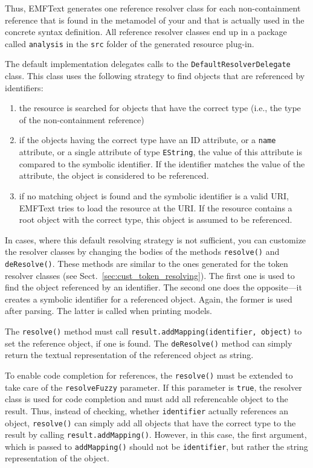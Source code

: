 Thus, EMFText generates one reference resolver class for each non-containment
reference that is found in the metamodel of your \DSL and that is actually used
in the concrete syntax definition. All reference resolver classes end up in a
package called \texttt{analysis} in the \texttt{src} folder of the generated 
resource plug-in.

The default implementation delegates calls to the
\texttt{DefaultResolverDelegate} class. This class uses the following strategy
to find objects that are referenced by identifiers:

\begin{enumerate}
  \item the resource is searched for objects that have the correct type (i.e.,
  the type of the non-containment reference)
  \item if the objects having the correct type have an ID attribute, or a
  \texttt{name} attribute, or a single attribute of type \texttt{EString}, the
  value of this attribute is compared to the symbolic identifier. If the
  identifier matches the value of the attribute, the object is considered to be
  referenced.
  \item if no matching object is found and the symbolic identifier is a valid
  URI, EMFText tries to load the resource at the URI. If the resource
  contains a root object with the correct type, this object is assumed to be
  referenced.
\end{enumerate}

In cases, where this default resolving strategy is not sufficient, you can
customize the resolver classes by changing the bodies of the methods
\texttt{resolve()} and \texttt{deResolve()}. These methods are similar to the
ones generated for the token resolver classes (see
Sect.~\ref{sec:cust_token_resolving}). The first one is used to find the object
referenced by an identifier. The second one does the opposite---it creates a
symbolic identifier for a referenced object. Again, the former is used after
parsing. The latter is called when printing models.

The \texttt{resolve()} method must call \texttt{result.addMapping(identifier,
object)} to set the reference object, if one is found. The
\texttt{deResolve()} method can simply return the textual representation of the
referenced object as string.

To enable code completion for references, the \texttt{resolve()} must be
extended to take care of the \texttt{resolveFuzzy} parameter. If this parameter is
\texttt{true}, the resolver class is used for code completion and must add all
referencable object to the result. Thus, instead of checking, whether
\texttt{identifier} actually references an object, \texttt{resolve()} can
simply add all objects that have the correct type to the result by calling
\texttt{result.addMapping()}. However, in this case, the first argument, which
is passed to \texttt{addMapping()} should not be \texttt{identifier}, but rather
the string representation of the object.

